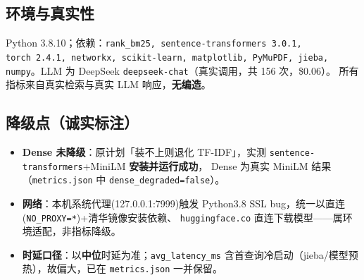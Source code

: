 \documentclass[11pt,a4paper,fontset=windows]{ctexart}
\begin{document}
\subsection{环境与真实性}
Python 3.8.10；依赖：\texttt{rank\_bm25, sentence-transformers~3.0.1, torch~2.4.1, networkx, scikit-learn,
matplotlib, PyMuPDF, jieba, numpy}。LLM 为 DeepSeek \texttt{deepseek-chat}（真实调用，共 156 次，\$0.06）。
所有指标来自真实检索与真实 LLM 响应，\textbf{无编造}。

\subsection{降级点（诚实标注）}
\begin{itemize}
\item \textbf{Dense 未降级}：原计划「装不上则退化 TF-IDF」，实测 \texttt{sentence-transformers}+MiniLM \textbf{安装并运行成功}，
      Dense 为真实 MiniLM 结果（\texttt{metrics.json} 中 \texttt{dense\_degraded=false}）。
\item \textbf{网络}：本机系统代理(127.0.0.1:7999)触发 Python3.8 SSL bug，统一以直连(\texttt{NO\_PROXY=*})+清华镜像安装依赖、
      \texttt{huggingface.co} 直连下载模型——属环境适配，非指标降级。
\item \textbf{时延口径}：以\textbf{中位}时延为准；\texttt{avg\_latency\_ms} 含首查询冷启动（jieba/模型预热），故偏大，已在 \texttt{metrics.json} 一并保留。
\end{itemize}
\end{document}
